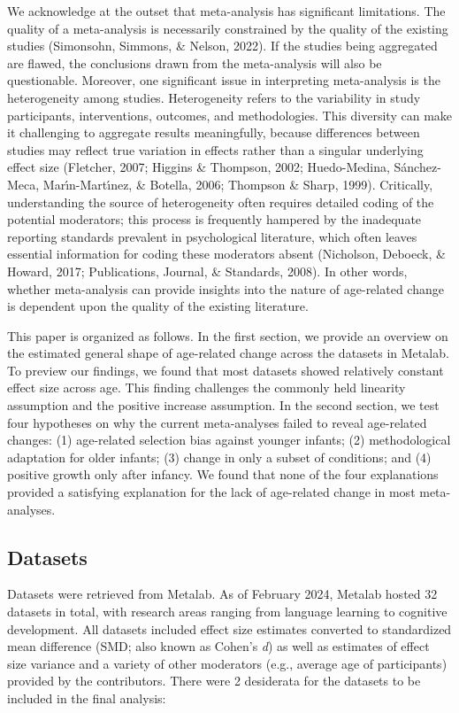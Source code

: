 \documentclass[
  man]{apa6}
\begin{document}
We acknowledge at the outset that meta-analysis has significant limitations. The quality of a meta-analysis is necessarily constrained by the quality of the existing studies (Simonsohn, Simmons, \& Nelson, 2022). If the studies being aggregated are flawed, the conclusions drawn from the meta-analysis will also be questionable. Moreover, one significant issue in interpreting meta-analysis is the heterogeneity among studies. Heterogeneity refers to the variability in study participants, interventions, outcomes, and methodologies. This diversity can make it challenging to aggregate results meaningfully, because differences between studies may reflect true variation in effects rather than a singular underlying effect size (Fletcher, 2007; Higgins \& Thompson, 2002; Huedo-Medina, Sánchez-Meca, Marı́n-Martı́nez, \& Botella, 2006; Thompson \& Sharp, 1999). Critically, understanding the source of heterogeneity often requires detailed coding of the potential moderators; this process is frequently hampered by the inadequate reporting standards prevalent in psychological literature, which often leaves essential information for coding these moderators absent (Nicholson, Deboeck, \& Howard, 2017; Publications, Journal, \& Standards, 2008). In other words, whether meta-analysis can provide insights into the nature of age-related change is dependent upon the quality of the existing literature.

This paper is organized as follows. In the first section, we provide an overview on the estimated general shape of age-related change across the datasets in Metalab. To preview our findings, we found that most datasets showed relatively constant effect size across age. This finding challenges the commonly held linearity assumption and the positive increase assumption. In the second section, we test four hypotheses on why the current meta-analyses failed to reveal age-related changes: (1) age-related selection bias against younger infants; (2) methodological adaptation for older infants; (3) change in only a subset of conditions; and (4) positive growth only after infancy. We found that none of the four explanations provided a satisfying explanation for the lack of age-related change in most meta-analyses.

\hypertarget{datasets}{%
\subsection{Datasets}\label{datasets}}

Datasets were retrieved from Metalab. As of February 2024, Metalab hosted 32 datasets in total, with research areas ranging from language learning to cognitive development. All datasets included effect size estimates converted to standardized mean difference (SMD; also known as Cohen's \emph{d}) as well as estimates of effect size variance and a variety of other moderators (e.g., average age of participants) provided by the contributors. There were 2 desiderata for the datasets to be included in the final analysis:
\end{document}
